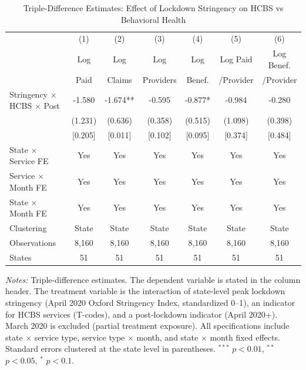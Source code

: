\begin{table}[htbp]
\centering
\caption{Triple-Difference Estimates: Effect of Lockdown Stringency on HCBS vs Behavioral Health}
\label{tab:main_ddd}
\small
\begin{tabular}{lcccccc}
\hline\hline
 & (1) & (2) & (3) & (4) & (5) & (6) \\
 & Log & Log & Log & Log & Log Paid & Log Benef. \\
 & Paid & Claims & Providers & Benef. & /Provider & /Provider \\
\hline
Stringency $\times$ HCBS $\times$ Post & -1.580 & -1.674** & -0.595 & -0.877* & -0.984 & -0.280 \\
 & (1.231) & (0.636) & (0.358) & (0.515) & (1.098) & (0.398) \\
 & [0.205] & [0.011] & [0.102] & [0.095] & [0.374] & [0.484] \\
[6pt]
\hline
State $\times$ Service FE & Yes & Yes & Yes & Yes & Yes & Yes \\
Service $\times$ Month FE & Yes & Yes & Yes & Yes & Yes & Yes \\
State $\times$ Month FE & Yes & Yes & Yes & Yes & Yes & Yes \\
Clustering & State & State & State & State & State & State \\
Observations & 8,160 & 8,160 & 8,160 & 8,160 & 8,160 & 8,160 \\
States & 51 & 51 & 51 & 51 & 51 & 51 \\
\hline\hline
\end{tabular}
\begin{minipage}{0.95\textwidth}
\vspace{4pt}
\footnotesize
\textit{Notes:} Triple-difference estimates. The dependent variable is stated in the column header. The treatment variable is the interaction of state-level peak lockdown stringency (April 2020 Oxford Stringency Index, standardized 0--1), an indicator for HCBS services (T-codes), and a post-lockdown indicator (April 2020+). March 2020 is excluded (partial treatment exposure). All specifications include state $\times$ service type, service type $\times$ month, and state $\times$ month fixed effects. Standard errors clustered at the state level in parentheses. $^{***}$ $p<0.01$, $^{**}$ $p<0.05$, $^{*}$ $p<0.1$.
\end{minipage}
\end{table}
